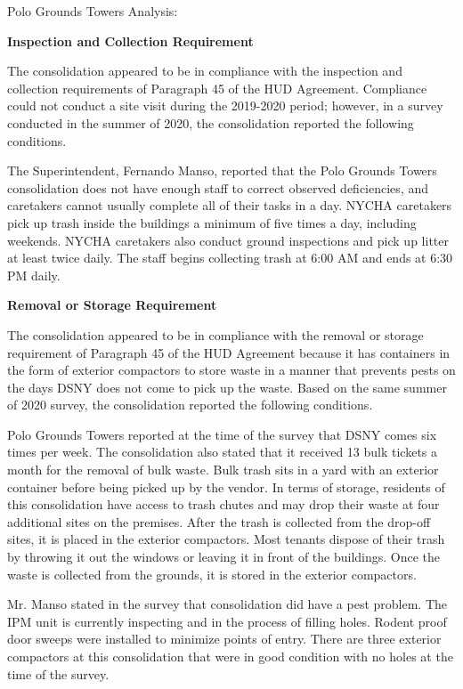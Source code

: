 Polo Grounds Towers Analysis: 

\textbf{Inspection and Collection Requirement} 

 

The consolidation appeared to be in compliance with the inspection and collection requirements of Paragraph 45 of the HUD Agreement. Compliance could not conduct a site visit during the 2019-2020 period; however, in a survey conducted in the summer of 2020, the consolidation reported the following conditions.

The Superintendent, Fernando Manso, reported that the Polo Grounds Towers consolidation does not have enough staff to correct observed deficiencies, and caretakers cannot usually complete all of their tasks in a day. NYCHA caretakers pick up trash inside the buildings a minimum of five times a day, including weekends. NYCHA caretakers also conduct ground inspections and pick up litter at least twice daily. The staff begins collecting trash at 6:00 AM and ends at 6:30 PM daily.

\textbf{Removal or Storage Requirement} 

The consolidation appeared to be in compliance with the removal or storage requirement of Paragraph  45 of the HUD Agreement because it has containers in the form of exterior compactors to store waste in a manner that prevents pests on the days DSNY does not come to pick up the waste. Based on the same summer of  2020  survey, the consolidation reported the following conditions.

  

Polo Grounds Towers reported at the time of the survey that DSNY comes six times per week. The consolidation also stated that it received 13 bulk tickets a month for the removal of bulk waste. Bulk trash sits in a yard with an exterior container before being picked up by the vendor. In terms of storage, residents of this consolidation have access to trash chutes and may drop their waste at four additional sites on the premises. After the trash is collected from the drop-off sites, it is placed in the exterior compactors.  Most tenants dispose of their trash by throwing it out the windows or leaving it in front of the buildings. Once the waste is collected from the grounds, it is stored in the exterior compactors.  

 

Mr. Manso stated in the survey that consolidation did have a pest problem. The IPM unit is currently inspecting and in the process of filling holes. Rodent proof door sweeps were installed to minimize points of entry.  There are three exterior compactors at this consolidation that were in good condition with no holes at the time of the survey.

